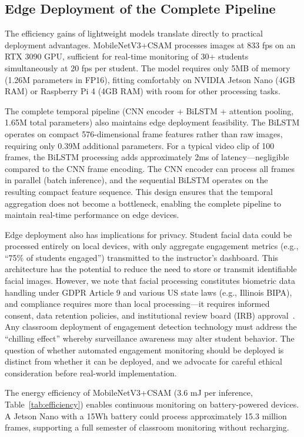 \documentclass[sensors,article,submit,pdftex,moreauthors]{Definitions/mdpi}
\begin{document}
\subsection{Edge Deployment of the Complete Pipeline}

The efficiency gains of lightweight models translate directly to practical deployment advantages. MobileNetV3+CSAM processes images at 833 fps on an RTX 3090 GPU, sufficient for real-time monitoring of 30+ students simultaneously at 20 fps per student. The model requires only 5MB of memory (1.26M parameters in FP16), fitting comfortably on NVIDIA Jetson Nano (4GB RAM) or Raspberry Pi 4 (4GB RAM) with room for other processing tasks.

The complete temporal pipeline (CNN encoder + BiLSTM + attention pooling, 1.65M total parameters) also maintains edge deployment feasibility. The BiLSTM operates on compact 576-dimensional frame features rather than raw images, requiring only 0.39M additional parameters. For a typical video clip of 100 frames, the BiLSTM processing adds approximately 2ms of latency---negligible compared to the CNN frame encoding. The CNN encoder can process all frames in parallel (batch inference), and the sequential BiLSTM operates on the resulting compact feature sequence. This design ensures that the temporal aggregation does not become a bottleneck, enabling the complete pipeline to maintain real-time performance on edge devices.

Edge deployment also has implications for privacy. Student facial data could be processed entirely on local devices, with only aggregate engagement metrics (e.g., ``75\% of students engaged'') transmitted to the instructor's dashboard. This architecture has the potential to reduce the need to store or transmit identifiable facial images. However, we note that facial processing constitutes biometric data handling under GDPR Article 9 and various US state laws (e.g., Illinois BIPA), and compliance requires more than local processing---it requires informed consent, data retention policies, and institutional review board (IRB) approval~\cite{williamson2020surveillance}. Any classroom deployment of engagement detection technology must address the ``chilling effect'' whereby surveillance awareness may alter student behavior. The question of whether automated engagement monitoring should be deployed is distinct from whether it can be deployed, and we advocate for careful ethical consideration before real-world implementation.

The energy efficiency of MobileNetV3+CSAM (3.6 mJ per inference, Table~\ref{tab:efficiency}) enables continuous monitoring on battery-powered devices. A Jetson Nano with a 15Wh battery could process approximately 15.3 million frames, supporting a full semester of classroom monitoring without recharging.
\end{document}
